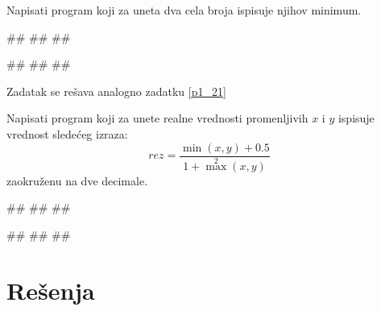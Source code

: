 \begin{Exercise}[label=p1_21]
Napisati program koji za uneta dva cela broja ispisuje njihov minimum. 

\begin{miditest}
\begin{upotreba}{1}
#\naslovInt#
##
##
\end{upotreba}
\end{miditest}
\begin{miditest}
\begin{upotreba}{2}
#\naslovInt#
##
##
\end{upotreba}
\end{miditest}

\end{Exercise}
\ifresenja
\begin{Answer}[ref=p1_21]
Zadatak se rešava analogno zadatku \ref{p1_21}
\end{Answer}
\fi

\begin{Exercise}[label=p1_22]
Napisati program koji za unete realne vrednosti promenljivih $x$ i
$y$ ispisuje vrednost sledećeg izraza:
$$rez = \frac{\min(x, y) + 0.5}{1 + \max^2(x, y)}$$ zaokruženu na dve decimale. 

\begin{miditest}
\begin{upotreba}{1}
#\naslovInt#
##
##
\end{upotreba}
\end{miditest}
\begin{miditest}
\begin{upotreba}{1}
#\naslovInt#
##
##
\end{upotreba}
\end{miditest}

\end{Exercise}
\ifresenja
\begin{Answer}[ref=p1_22]
\end{Answer}
\fi


\ifresenja
\section{Rešenja}
\shipoutAnswer
\fi

